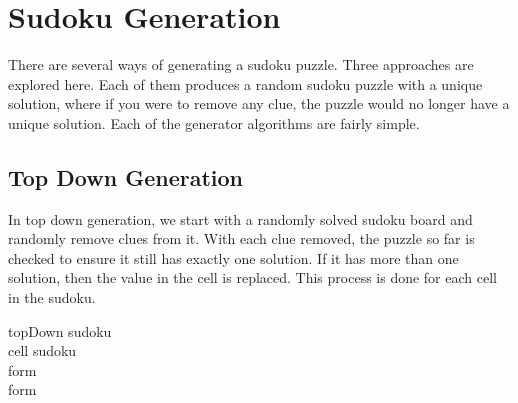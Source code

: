 
\section{Sudoku Generation}

There are several ways of generating a sudoku puzzle. Three approaches are explored here. Each of them produces a random
sudoku puzzle with a unique solution, where if you were to remove any clue, the puzzle would no longer have a unique solution.
Each of the generator algorithms are fairly simple.

\subsection{Top Down Generation}
In top down generation, we start with a randomly solved sudoku board and randomly remove clues from it. With each clue removed,
the puzzle so far is checked to ensure it still has exactly one solution. If it has more than one solution, then the value in the
cell is replaced. This process is done for each cell in the sudoku.
\begin{center}
\begin{pseudocode}[framebox]{topDown}{ }
    sudoku \GETS {}       \\
    \FOR cell \in sudoku \DO \BEGIN
                  \\
        form \GETS {}         \\
        \IF form \neq {} \THEN
    \END                                            \\
    \label{algo:topdown}
\end{pseudocode}
\end{center}

